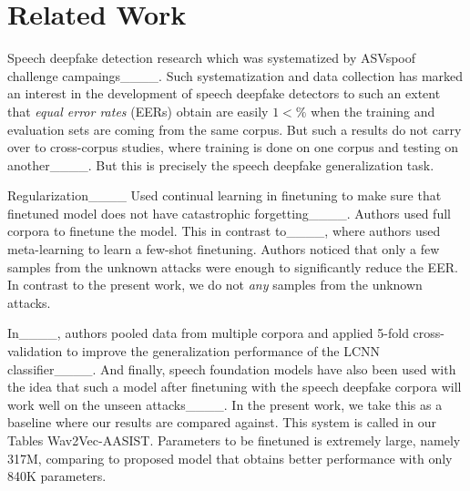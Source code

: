 \section{Related Work}
Speech deepfake detection research which was systematized by ASVspoof challenge campaings____. Such systematization and data collection has marked an interest in the development of speech deepfake detectors to such an extent that {\em equal error rates} (EERs) obtain are easily $1<\%$ when the training and evaluation sets are coming from the same corpus. But such a results do not carry over to cross-corpus studies, where training is done on one corpus and testing on another____. But this is precisely the speech deepfake generalization task. 

Regularization____
Used continual learning in finetuning to make sure that finetuned model does not have catastrophic forgetting____. Authors used full corpora to finetune the model. This in contrast to____, where authors used meta-learning to learn a few-shot finetuning. Authors noticed that only a few samples from the unknown attacks were enough to significantly reduce the EER. In contrast to the present work, we do not {\em any} samples from the unknown attacks. 

In____, authors pooled data from multiple corpora and applied 5-fold cross-validation to improve the generalization performance of the LCNN classifier____. And finally, speech foundation models have also been used with the idea that such a model after finetuning with the speech deepfake corpora will work well on the unseen attacks____. In the present work, we take this as a baseline where our results are compared against. This system is called in our Tables Wav2Vec-AASIST. Parameters to be finetuned is extremely large, namely 317M, comparing to proposed model that obtains better performance with only 840K parameters.